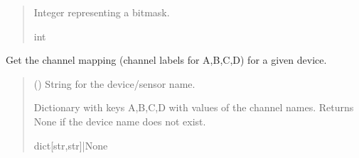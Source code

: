 \documentclass[letterpaper,10pt,english]{sphinxmanual}
\begin{document}
\begin{fulllineitems}
\begin{fulllineitems}
\begin{quote}
\begin{description}
\begin{itemize}
\end{itemize}

\sphinxAtStartPar
Integer representing a bitmask.

\sphinxAtStartPar
int

\end{description}\end{quote}

\end{fulllineitems}


\begin{fulllineitems}
\label{\detokenize{PodDevice_8401HR:PodDevice_8401HR.POD_8401HR.GetChannelMapForPreampDevice}}
\pysigstartsignatures
{}
\pysigstopsignatures
\sphinxAtStartPar
Get the channel mapping (channel labels for A,B,C,D) for a given device.
\begin{quote}\begin{description}
\sphinxAtStartPar
{} () \textendash{} String for the device/sensor name.

\sphinxAtStartPar
Dictionary with keys A,B,C,D with values of the channel names. Returns                 None if the device name does not exist.

\sphinxAtStartPar
dict{[}str,str{]}|None

\end{description}\end{quote}

\end{fulllineitems}



\end{fulllineitems}
\end{document}
